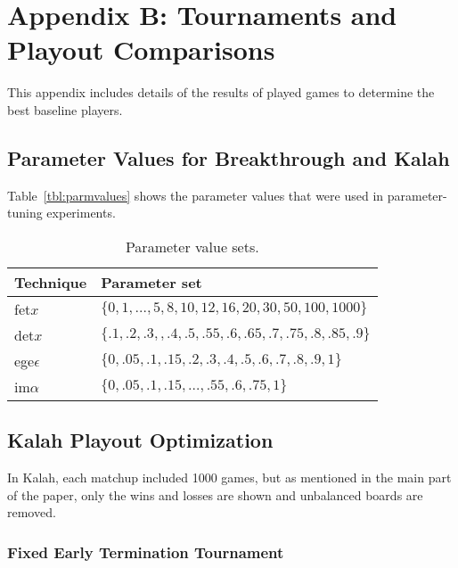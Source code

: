 \documentclass{article}
\begin{document}
\section{Appendix B: Tournaments and Playout Comparisons}
\label{app:results}

This appendix includes details of the results of played games to determine the best baseline players. 

\subsection{Parameter Values for Breakthrough and Kalah}

Table~\ref{tbl:parmvalues} shows the parameter values that were used in parameter-tuning experiments.

\begin{table}[h!]
\begin{center}
\begin{tabular}{|l|l|}
\hline
Technique & Parameter set \\
\hline
fet$x$          & $\{ 0, 1, \ldots, 5, 8, 10, 12, 16, 20, 30, 50, 100, 1000 \}$ \\
det$x$         & $\{ .1, .2, .3, , .4, .5, .55, .6, .65, .7, .75, .8, .85, .9 \}$ \\
ege$\epsilon$  & $\{ 0, .05, .1, .15, .2, .3, .4, .5, .6, .7, .8, .9, 1 \}$ \\
im$\alpha$     & $\{ 0, .05, .1, .15, \ldots, .55, .6, .75, 1 \}$ \\
\hline
\end{tabular}
\end{center}
\caption{Parameter value sets. \label{tbl:parmvalues}}
\label{tbl:parmsets}
\end{table}

\subsection{Kalah Playout Optimization}

In Kalah, each matchup included 1000 games, but as mentioned in the main part of the 
paper, only the wins and losses are shown and unbalanced boards are removed. 

\subsubsection{Fixed Early Termination Tournament}
\end{document}
